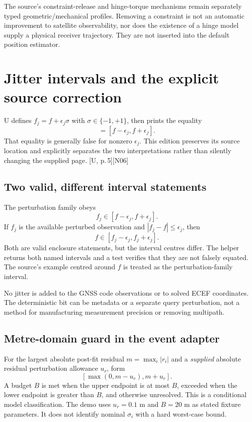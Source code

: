\documentclass[11pt,a4paper]{article}
\newcommand{\src}[1]{\textcolor{muted}{[U, #1]}}
\newcommand{\dec}[1]{\textcolor{accent}{[N#1]}}
\begin{document}
The source's constraint-release and hinge-torque mechanisms remain separately typed
geometric/mechanical profiles. Removing a constraint is not an automatic improvement
to satellite observability, nor does the existence of a hinge model supply a physical
receiver trajectory. They are not inserted into the default position estimator.
\clearpage

\section{Jitter intervals and the explicit source correction}
U defines $f_j=f+\epsilon_j\sigma$ with $\sigma\in\{-1,+1\}$, then prints the equality
\begin{equation}
[f_j-\epsilon_j,f_j+\epsilon_j]=[f-\epsilon_j,f+\epsilon_j].
\end{equation}
That equality is generally false for nonzero $\epsilon_j$. This edition preserves
its source location and explicitly separates the two interpretations rather than
silently changing the supplied page. \src{p.\,5}\dec{06}

\subsection{Two valid, different interval statements}
The perturbation family obeys
\begin{equation}
f_j\in[f-\epsilon_j,f+\epsilon_j].
\end{equation}
If $f_j$ is the available perturbed observation and $|f_j-f|\le\epsilon_j$, then
\begin{equation}
f\in[f_j-\epsilon_j,f_j+\epsilon_j].
\end{equation}
Both are valid enclosure statements, but the interval centres differ. The helper
returns both named intervals and a test verifies that they are not falsely equated.
The source's example centred around $f$ is treated as the perturbation-family interval.

No jitter is added to the GNSS code observations or to solved ECEF coordinates.
The deterministic bit can be metadata or a separate query perturbation, not a method
for manufacturing measurement precision or removing multipath.

\subsection{Metre-domain guard in the event adapter}
For the largest absolute post-fit residual $m=\max_i|r_i|$ and a \emph{supplied}
absolute residual perturbation allowance $u_r$, form
\begin{equation}
\left[\max(0,m-u_r),m+u_r\right].
\end{equation}
A budget $B$ is met when the upper endpoint is at most $B$, exceeded when the lower
endpoint is greater than $B$, and otherwise unresolved. This is a conditional model
classification. The demo uses $u_r=0.1$ m and $B=20$ m as stated fixture parameters.
It does not identify nominal $\sigma_i$ with a hard worst-case bound.
\clearpage
\end{document}
